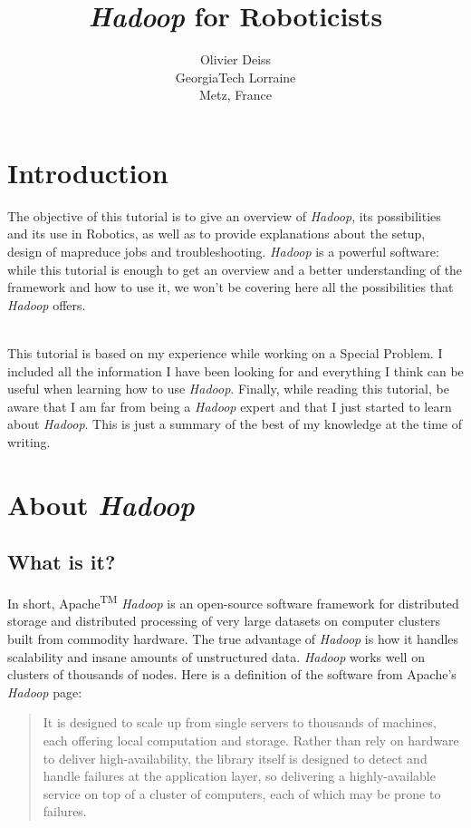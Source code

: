 \documentclass[a4paper, 12pt]{article}
\title{\textit{Hadoop} for Roboticists}
\author{Olivier Deiss\\GeorgiaTech Lorraine\\Metz, France}
\begin{document}
\maketitle
\tableofcontents

\section{Introduction}

The objective of this tutorial is to give an overview of \textit{Hadoop}, its possibilities and its use in Robotics, as well as to provide explanations about the setup, design of mapreduce jobs and troubleshooting. \textit{Hadoop} is a powerful software: while this tutorial is enough to get an overview and a better understanding of the framework and how to use it, we won't be covering here all the possibilities that \textit{Hadoop} offers.

~\\
This tutorial is based on my experience while working on a Special Problem. I included all the information I have been looking for and everything I think can be useful when learning how to use \textit{Hadoop}. Finally, while reading this tutorial, be aware that I am far from being a \textit{Hadoop} expert and that I just started to learn about \textit{Hadoop}. This is just a summary of the best of my knowledge at the time of writing.

\section{About \textit{Hadoop}}

  \subsection{What is it?}

In short, Apache\textsuperscript{TM} \textit{Hadoop}\textsuperscript{\textregistered} is an open-source software framework for distributed storage and distributed processing of very large datasets on computer clusters built from commodity hardware. The true advantage of \textit{Hadoop} is how it handles scalability and insane amounts of unstructured data. \textit{Hadoop} works well on clusters of thousands of nodes. Here is a definition of the software from Apache's \textit{Hadoop} page:

\begin{quote}
It is designed to scale up from single servers to thousands of machines, each offering local computation and storage. Rather than rely on hardware to deliver high-availability, the library itself is designed to detect and handle failures at the application layer, so delivering a highly-available service on top of a cluster of computers, each of which may be prone to failures.
\end{quote}
\end{document}
